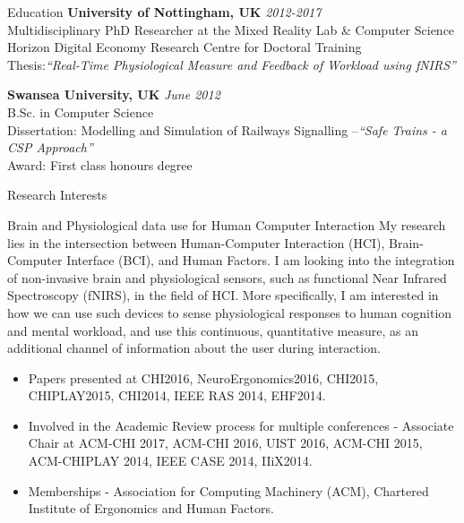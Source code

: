 \documentclass{resume} %
\begin{document}

\begin{rSection}{Education}
{\bf University of Nottingham, UK} \hfill {\em 2012-2017} \\
Multidisciplinary PhD Researcher at the Mixed Reality Lab \& Computer Science \\
Horizon Digital Economy Research Centre for Doctoral Training \\
Thesis:\emph{``Real-Time Physiological Measure and Feedback of Workload using fNIRS''} \smallskip \\
\vspace{-1 mm}

{\bf Swansea University, UK} \hfill {\em June 2012} \\
B.Sc. in Computer Science \\
Dissertation: Modelling and Simulation of Railways Signalling –\emph{``Safe Trains - a CSP Approach''}\smallskip \\
Award: First class honours degree

\end{rSection}

\begin{rSection}{Research Interests}
\begin{rSubsection}{Brain and Physiological data use for Human Computer Interaction}{ }{ }{ }
\vspace{-5 mm}
My research lies in the intersection between Human-Computer Interaction (HCI), Brain-Computer Interface (BCI), and Human Factors. I am looking into the integration of non-invasive brain and physiological sensors, such as functional Near Infrared Spectroscopy (fNIRS), in the field of HCI. More specifically, I am interested in how we can use such devices to sense physiological responses to human cognition and mental workload, and use this continuous, quantitative measure, as an additional channel of information about the user during interaction.

\begin{itemize}
  \item Papers presented at CHI2016, NeuroErgonomics2016, CHI2015, CHIPLAY2015, CHI2014, IEEE RAS 2014, EHF2014.
  \item Involved in the Academic Review process for multiple conferences - Associate Chair at ACM-CHI 2017, ACM-CHI 2016, UIST 2016, ACM-CHI 2015, ACM-CHIPLAY 2014, IEEE CASE 2014, IIiX2014.
  \item  Memberships - Association for Computing Machinery (ACM), Chartered Institute of Ergonomics and Human Factors.
\end{itemize}

\end{rSubsection}

\end{rSection}
\end{document}
